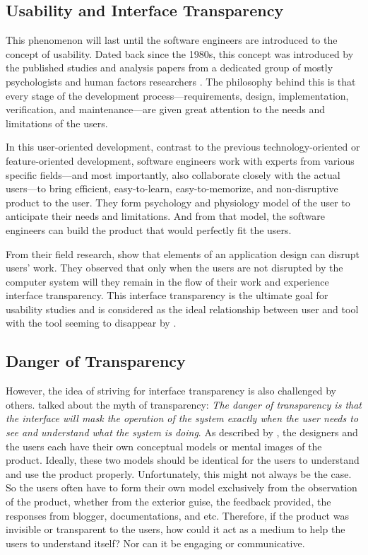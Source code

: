 \documentclass{acm_proc_article-sp}
\begin{document}
\subsection{Usability and Interface Transparency}
This phenomenon will last until the software engineers are introduced
to the concept of usability. Dated back since the 1980s, this concept
was introduced by the published studies and analysis papers from a
dedicated group of mostly psychologists and human factors researchers
\citep{human:rubinstein, friendly:simpson, human:shneiderman,
  human:brown, software:dumas}. The philosophy behind this is that
every stage of the development process---requirements, design,
implementation, verification, and maintenance---are given great
attention to the needs and limitations of the users.

In this user-oriented development, contrast to the previous
technology-oriented or feature-oriented development, software
engineers work with experts from various specific fields---and most
importantly, also collaborate closely with the actual users---to bring
efficient, easy-to-learn, easy-to-memorize, and non-disruptive product
to the user. They form psychology and physiology model of the user to
anticipate their needs and limitations. And from that model, the
software engineers can build the product that would perfectly fit the
users.

From their field research, \citet{transparency:holtzblatt} show that
elements of an application design can disrupt users' work. They
observed that only when the users are not disrupted by the computer
system will they remain in the flow of their work and experience
interface transparency. This interface transparency is the ultimate
goal for usability studies and is considered as the ideal relationship
between user and tool with the tool seeming to disappear by
\citet{transparency:rutkoski}.

\subsection{Danger of Transparency}
However, the idea of striving for interface transparency is also
challenged by others. \citet{windows:bolter} talked about the myth of
transparency: \textit{The danger of transparency is that the interface
  will mask the operation of the system exactly when the user needs to
  see and understand what the system is doing}. As described by
\citet{design:norman}, the designers and the users each have their own
conceptual models or mental images of the product. Ideally, these two
models should be identical for the users to understand and use the
product properly. Unfortunately, this might not always be the case. So
the users often have to form their own model exclusively from the
observation of the product, whether from the exterior guise, the
feedback provided, the responses from blogger, documentations, and
etc. Therefore, if the product was invisible or transparent to the
users, how could it act as a medium to help the users to understand
itself? Nor can it be engaging or communicative.
\end{document}
